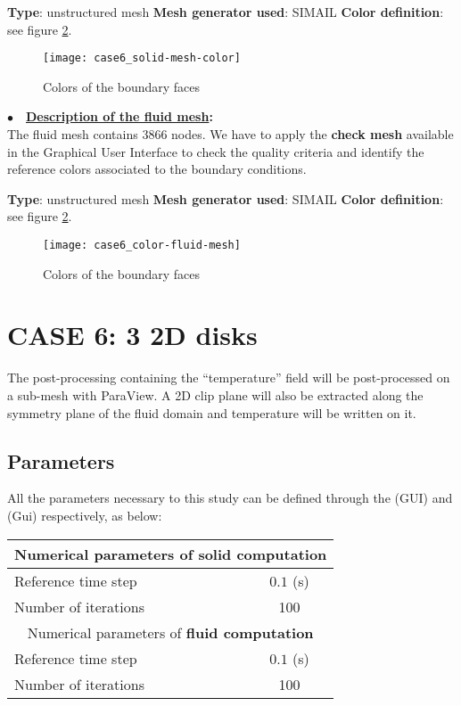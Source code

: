 {\bfseries Type}: unstructured mesh
\vspace{0.1in}
{\bfseries Mesh generator used}: SIMAIL
{\bfseries Color definition}: see figure \ref{fige1_e5}.

\begin{figure}[h!]
\begin{center}
\texttt{[image: case6\_solid-mesh-color]}
\caption{Colors of the boundary faces}
\label{fige1_e5}
\end{center}
\end{figure}

$\bullet${~~\bf \underline{Description of the fluid mesh}:}\\

The fluid mesh contains 3866 nodes. We have to apply the
{\bf check mesh} available in the \CS Graphical User Interface to
check the quality criteria and identify the reference colors
associated to the boundary conditions.

{\bfseries Type}: unstructured mesh
{\bfseries Mesh generator used}: SIMAIL
{\bfseries Color definition}: see figure \ref{fige1_e5}.

\begin{figure}[h!]
\begin{center}
\texttt{[image: case6\_color-fluid-mesh]}
\caption{Colors of the boundary faces}
\label{fige1_e5}
\end{center}
\end{figure}

\newpage
\section{CASE 6: 3 2D disks}

The post-processing containing the ``temperature'' field will be post-processed on a
sub-mesh with ParaView. A 2D clip plane will also be extracted along the symmetry plane of the fluid
domain and temperature will be written on it.


        \subsection{Parameters}
All the parameters necessary to this study can be defined through the \CS (GUI)
and \syrthes (Gui) respectively, as below:

\begin{center}
\begin{tabular}{|l|c|}
\hline
\multicolumn{2}{|c|}{ Numerical parameters of {\bf solid computation}} \\
\hline
Reference time step  & $0.1$ (s) \\
\hline
Number of iterations & 100 \\
\hline
\hline
\multicolumn{2}{|c|}{ Numerical parameters of {\bf fluid computation}} \\
\hline
Reference time step  & $0.1$ (s) \\
\hline
Number of iterations & 100 \\
\hline
\end{tabular}\\
\end{center}

